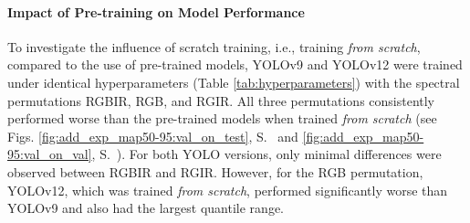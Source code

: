 \paragraph{Impact of Pre-training on Model Performance} 

To investigate the influence of scratch training, i.e., training \textit{from scratch}, compared to the use of pre-trained models, YOLOv9 and YOLOv12 were trained under identical hyperparameters (Table \ref{tab:hyperparameters}) with the spectral permutations \acrshort{RGBIR}, \acrshort{RGB}, and \acrshort{RGIR}. All three permutations consistently performed worse than the pre-trained models when trained \textit{from scratch} (see Figs. \ref{fig:add_exp_map50-95:val_on_test}, S.~\pageref{fig:add_exp_map50-95:val_on_test} and \ref{fig:add_exp_map50-95:val_on_val}, S.~\pageref{fig:add_exp_map50-95:val_on_val}). For both YOLO versions, only minimal differences were observed between \acrshort{RGBIR} and \acrshort{RGIR}. However, for the \acrshort{RGB} permutation, YOLOv12, which was trained \textit{from scratch}, performed significantly worse than YOLOv9 and also had the largest quantile range. %






